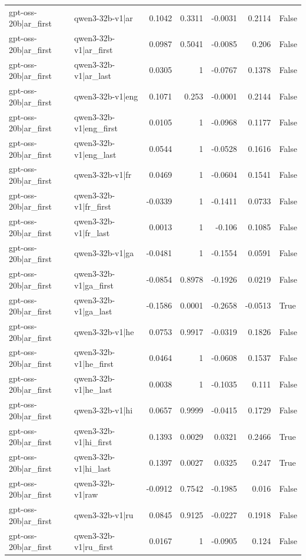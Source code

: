 \begin{table}
\begin{tabular}{l l r r r r l}
gpt-oss-20b|ar_first & qwen3-32b-v1|ar & 0.1042 & 0.3311 & -0.0031 & 0.2114 & False \\
gpt-oss-20b|ar_first & qwen3-32b-v1|ar_first & 0.0987 & 0.5041 & -0.0085 & 0.206 & False \\
gpt-oss-20b|ar_first & qwen3-32b-v1|ar_last & 0.0305 & 1 & -0.0767 & 0.1378 & False \\
gpt-oss-20b|ar_first & qwen3-32b-v1|eng & 0.1071 & 0.253 & -0.0001 & 0.2144 & False \\
gpt-oss-20b|ar_first & qwen3-32b-v1|eng_first & 0.0105 & 1 & -0.0968 & 0.1177 & False \\
gpt-oss-20b|ar_first & qwen3-32b-v1|eng_last & 0.0544 & 1 & -0.0528 & 0.1616 & False \\
gpt-oss-20b|ar_first & qwen3-32b-v1|fr & 0.0469 & 1 & -0.0604 & 0.1541 & False \\
gpt-oss-20b|ar_first & qwen3-32b-v1|fr_first & -0.0339 & 1 & -0.1411 & 0.0733 & False \\
gpt-oss-20b|ar_first & qwen3-32b-v1|fr_last & 0.0013 & 1 & -0.106 & 0.1085 & False \\
gpt-oss-20b|ar_first & qwen3-32b-v1|ga & -0.0481 & 1 & -0.1554 & 0.0591 & False \\
gpt-oss-20b|ar_first & qwen3-32b-v1|ga_first & -0.0854 & 0.8978 & -0.1926 & 0.0219 & False \\
gpt-oss-20b|ar_first & qwen3-32b-v1|ga_last & -0.1586 & 0.0001 & -0.2658 & -0.0513 & True \\
gpt-oss-20b|ar_first & qwen3-32b-v1|he & 0.0753 & 0.9917 & -0.0319 & 0.1826 & False \\
gpt-oss-20b|ar_first & qwen3-32b-v1|he_first & 0.0464 & 1 & -0.0608 & 0.1537 & False \\
gpt-oss-20b|ar_first & qwen3-32b-v1|he_last & 0.0038 & 1 & -0.1035 & 0.111 & False \\
gpt-oss-20b|ar_first & qwen3-32b-v1|hi & 0.0657 & 0.9999 & -0.0415 & 0.1729 & False \\
gpt-oss-20b|ar_first & qwen3-32b-v1|hi_first & 0.1393 & 0.0029 & 0.0321 & 0.2466 & True \\
gpt-oss-20b|ar_first & qwen3-32b-v1|hi_last & 0.1397 & 0.0027 & 0.0325 & 0.247 & True \\
gpt-oss-20b|ar_first & qwen3-32b-v1|raw & -0.0912 & 0.7542 & -0.1985 & 0.016 & False \\
gpt-oss-20b|ar_first & qwen3-32b-v1|ru & 0.0845 & 0.9125 & -0.0227 & 0.1918 & False \\
gpt-oss-20b|ar_first & qwen3-32b-v1|ru_first & 0.0167 & 1 & -0.0905 & 0.124 & False \\

\end{tabular}
\end{table}
